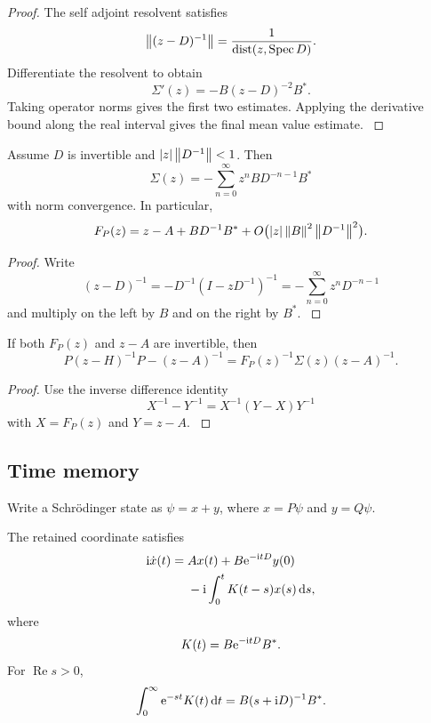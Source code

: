 \begin{proof}\label{strong:proof:047}
The self adjoint resolvent satisfies
\[
\left\lVert(z-D)^{-1}\right\rVert=\frac1{\operatorname{dist}(z,\operatorname{Spec} D)}.
\]
Differentiate the resolvent to obtain
\[
\Sigma'(z)=-B(z-D)^{-2}B^*.
\]
Taking operator norms gives the first two estimates. Applying the derivative bound along the real interval gives the final mean value estimate.
\label{strong:proof:047:end}\end{proof}

\begin{proposition}\label{strong:proposition:005}\label{strong:prop:low_energy_expansion}
Assume \(D\) is invertible and \(\left\lvert z\right\rvert\left\lVert D^{-1}\right\rVert<1\). Then
\[
\Sigma(z)
=-
\sum_{n=0}^{\infty}
z^nBD^{-n-1}B^*
\]
with norm convergence. In particular,
\[
F_P(z)
=
 z-A+BD^{-1}B^*+O\bigl(\left\lvert z\right\rvert\left\lVert B\right\rVert^2\left\lVert D^{-1}\right\rVert^2\bigr).
\]
\end{proposition}

\begin{proof}\label{strong:proof:048}
Write
\[
(z-D)^{-1}
=-D^{-1}(I-zD^{-1})^{-1}
=-\sum_{n=0}^{\infty}z^nD^{-n-1}
\]
and multiply on the left by \(B\) and on the right by \(B^*\).
\label{strong:proof:048:end}\end{proof}

\begin{proposition}\label{strong:proposition:006}\label{strong:prop:bare_truncation}
If both \(F_P(z)\) and \(z-A\) are invertible, then
\[
P(z-H)^{-1}P-(z-A)^{-1}
=
F_P(z)^{-1}\Sigma(z)(z-A)^{-1}.
\]
\end{proposition}

\begin{proof}\label{strong:proof:049}
Use the inverse difference identity
\[
X^{-1}-Y^{-1}=X^{-1}(Y-X)Y^{-1}
\]
with \(X=F_P(z)\) and \(Y=z-A\).
\label{strong:proof:049:end}\end{proof}

\subsection{Time memory}\label{strong:subsec:time_memory}

Write a Schrödinger state as \(\psi=x+y\), where \(x=P\psi\) and \(y=Q\psi\).

\begin{theorem}\label{strong:theorem:032}\label{strong:thm:memory_equation}
The retained coordinate satisfies
\[
\begin{aligned}
\ii\dot x(t)
={}&Ax(t)+B\e^{-\ii tD}y(0)\\
&-\ii\int_0^tK(t-s)x(s)\dd s,
\end{aligned}
\]
where
\[
K(t)=B\e^{-\ii tD}B^*.
\]
For \(\operatorname{Re}s>0\),
\[
\int_0^\infty\e^{-st}K(t)\dd t
=
B(s+\ii D)^{-1}B^*.
\]
\end{theorem}

